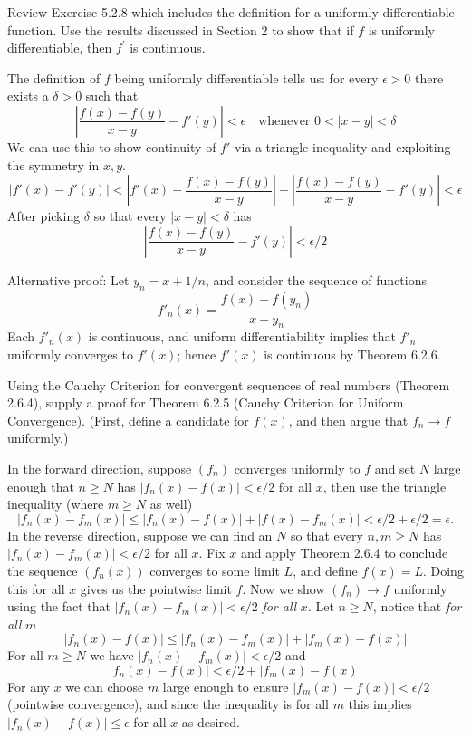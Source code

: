 \begin{exercise}
  Review Exercise 5.2.8 which includes the definition for a uniformly differentiable function. Use the results discussed in Section 2 to show that if $f$ is uniformly differentiable, then $f^{\prime}$ is continuous.

\end{exercise}
\begin{solution}
  The definition of $f$ being uniformly differentiable tells us: for every $\epsilon > 0$ there exists a $\delta > 0$ such that
  $$
  \left|\frac{f(x)-f(y)}{x-y} - f'(y)\right| < \epsilon \quad \text{whenever $0<|x-y|<\delta$}
  $$
  We can use this to show continuity of $f'$ via a triangle inequality and exploiting the symmetry in $x,y$.
  $$
  |f'(x) - f'(y)|
  < \left|f'(x) - \frac{f(x)-f(y)}{x-y}\right|
  + \left|\frac{f(x)-f(y)}{x-y} - f'(y)\right|
  < \epsilon
  $$
  After picking $\delta$ so that every $|x-y|<\delta$ has
  $$
  \left|\frac{f(x)-f(y)}{x-y} - f'(y)\right| < \epsilon/2
  $$

  Alternative proof: Let \(y_n = x + 1/n\), and consider the sequence of functions
  \[f'_n(x) = \frac{f(x) - f(y_n)}{x - y_n}\]
  Each \(f'_n(x)\) is continuous, and uniform differentiability implies that \(f'_n\) uniformly converges to \(f'(x)\); hence \(f'(x)\) is continuous by Theorem 6.2.6.
\end{solution}
\begin{exercise}
  Using the Cauchy Criterion for convergent sequences of real numbers (Theorem 2.6.4), supply a proof for Theorem 6.2.5 (Cauchy Criterion for Uniform Convergence). (First, define a candidate for $f(x)$, and then argue that $f_{n} \rightarrow f$ uniformly.)

\end{exercise}
\begin{solution}
  In the forward direction, suppose $(f_n)$ converges uniformly to $f$ and set $N$ large enough that $n \ge N$ has $|f_n(x) - f(x)| < \epsilon/2$ for all $x$, then use the triangle inequality (where $m \ge N$ as well)
  $$
  |f_n(x) - f_m(x)| \le |f_n(x) - f(x)| + |f(x) - f_m(x)| < \epsilon/2 + \epsilon/2 = \epsilon.
  $$
  In the reverse direction, suppose we can find an $N$ so that every $n,m \ge N$ has $|f_n(x) - f_m(x)| < \epsilon /2$ for all $x$.
  Fix $x$ and apply Theorem 2.6.4 to conclude the sequence $(f_n(x))$ converges to some limit $L$, and define $f(x) = L$. Doing this for all $x$ gives us the pointwise limit $f$. Now we show $(f_n) \to f$ uniformly using the fact that $|f_n(x) - f_m(x)| < \epsilon / 2$ \emph{for all} $x$.
  Let $n \ge N$, notice that \emph{for all} $m$
  $$
  |f_n(x) - f(x)| \le |f_n(x) - f_m(x)| + |f_m(x) - f(x)|
  $$
  For all $m \ge N$ we have $|f_n(x) - f_m(x)| < \epsilon / 2$ and
  $$
  |f_n(x) - f(x)| < \epsilon/2 + |f_m(x) - f(x)|
  $$
  For any \(x\) we can choose \(m\) large enough to ensure $|f_m(x) - f(x)| < \epsilon / 2$ (pointwise convergence), and since the inequality is for all $m$ this implies $|f_n(x) - f(x)| \le \epsilon$ for all $x$ as desired.
\end{solution}
